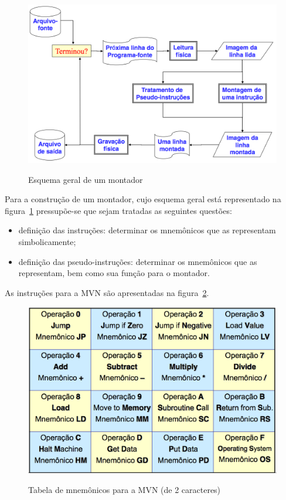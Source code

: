 \begin{figure}[ht]
	\centering
	\caption{Esquema geral de um montador}
	\includegraphics[width=\textwidth]{images/esquema-montador.png}
	\label{fig:esquema-montador}
\end{figure}

Para a construção de um montador, cujo esquema geral está representado na figura~\ref{fig:esquema-montador} pressupõe-se que sejam tratadas as seguintes questões:

\begin{itemize}
	\item definição das instruções: determinar os mnemônicos que as representam simbolicamente;
	\item definição das pseudo-instruções: determinar os mnemônicos que as representam, bem como sua função para o montador.
\end{itemize}

As instruções para a MVN são apresentadas na figura~\ref{fig:mnemonicos-mvn}.

\begin{figure}[ht]
	\centering
	\caption{Tabela de mnemônicos para a MVN (de 2 caracteres)}
	\includegraphics[width=\textwidth]{images/mnemonicos-mvn.png}
	\label{fig:mnemonicos-mvn}
\end{figure}
